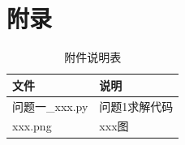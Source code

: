 \newpage
\makeatletter
\let\@oldaddcontentsline\addcontentsline
\renewcommand{\addcontentsline}[3]{}
\section*{附录}
\let\addcontentsline\@oldaddcontentsline
\makeatother

\begin{table}[H]
  \centering
  \caption{附件说明表}
  \label{tab:appendix}
  \renewcommand{\arraystretch}{1.2}
  \begin{tabularx}{\textwidth}{LX}
    \toprule
    文件 & 说明 \\
    \midrule
    问题一\_xxx.py & 问题1求解代码 \\
    xxx.png & xxx图 \\
    \bottomrule
  \end{tabularx}
\end{table}
